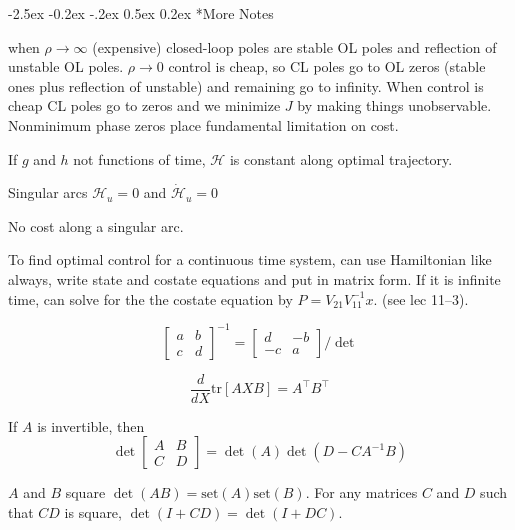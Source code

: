 \documentclass[letterpaper,twocolumn,notitlepage]{article}
\makeatletter
\renewcommand\section{\@startsection{section}{1}{\z@}%
{-2.5ex \@plus-0.2ex \@minus-.2ex}%
{0.5ex \@plus0.2ex}%
{\fontsize{11pt}{11pt}\selectfont\bfseries\sffamily}}
\makeatother
\begin{document}
  \section*{More Notes}

  when $\rho\rightarrow\infty$ (expensive) closed-loop poles are stable OL poles and reflection of unstable OL poles.
  $\rho\rightarrow0$ control is cheap, so CL poles go to OL zeros (stable ones plus reflection of unstable) and remaining go to infinity.
  When control is cheap CL poles go to zeros and we minimize $J$ by making things unobservable.
  Nonminimum phase zeros place fundamental limitation on cost.

  If $g$ and $h$ not functions of time, $\mathcal{H}$ is constant along optimal trajectory.

  Singular arcs $\mathcal{H}_{u}=0$ and $\dot{\mathcal{H}}_{u}=0$

  No cost along a singular arc.

  To find optimal control for a continuous time system, can use Hamiltonian like always, write state and costate equations and put in matrix form.
  If it is infinite time, can solve for the the costate equation by $P=V_{21}V_{11}^{-1}x$.
  (see lec 11--3).

  \begin{equation*}
    \begin{bmatrix}
      a & b \\
      c & d
    \end{bmatrix}^{-1}=
    \begin{bmatrix}
      d & -b \\
      -c & a
    \end{bmatrix}/\det
  \end{equation*}

  \begin{equation*}
    \frac{d}{dX}\text{tr}[AXB]=A^{\top}B^{\top}
  \end{equation*}

  If $A$ is invertible, then
  \begin{equation*}
    \det
    \begin{bmatrix}
      A & B \\
      C & D
    \end{bmatrix}=
    \det(A)\det(D-CA^{-1}B)
  \end{equation*}

  $A$ and $B$ square $\det(AB)=\text{set}(A)\text{set}(B)$.
  For any matrices $C$ and $D$ such that $CD$ is square, $\det(I+CD)=\det(I+DC)$.
\end{document}
